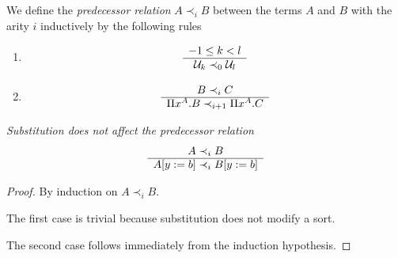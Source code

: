 \begin{definition}
    We define the
    \emph{predecessor relation}
    $A \prec_i B$ between the terms $A$
    and $B$ with the arity $i$ inductively by the following rules
    \begin{enumerate}
    \item
        $$
        \begin{array}{c} 
            -1 \le k < l
         \\ \hline 
            {\cal U}_k \prec_0 {\cal U}_l
        \end{array}
        $$

    \item
        $$
        \begin{array}{c} 
            B \prec_i C
         \\ \hline 
            \Pi x^A. B \prec_{i+1} \Pi x^A. C
        \end{array}
        $$
    \end{enumerate}
\end{definition}



\begin{lemma}
    \label{PrecedenceSubstitution}
    \emph{Substitution does not affect the predecessor relation}
    $$
    \begin{array}{c} A \prec_i B \\ \hline A[y:=b] \prec_i B[y:=b]\end{array}
    $$

    \begin{proof}
        By induction on $A \prec_i B$.

        The first case is trivial because substitution does not modify a sort.

        The second case follows immediately from the induction hypothesis.
    \end{proof}
\end{lemma}



